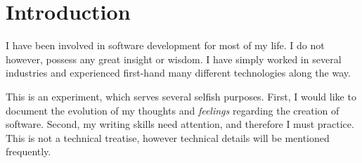 \section{Introduction}
I have been involved in software development for most of my life. I do
not however, possess any great insight or wisdom. I have simply worked
in several industries and experienced first-hand many different
technologies along the way.

This is an experiment, which serves several selfish purposes. First, I
would like to document the evolution of my thoughts and
\emph{feelings} regarding the creation of software. Second, my writing
skills need attention, and therefore I must practice. This is not a technical
treatise, however technical details will be mentioned frequently.

